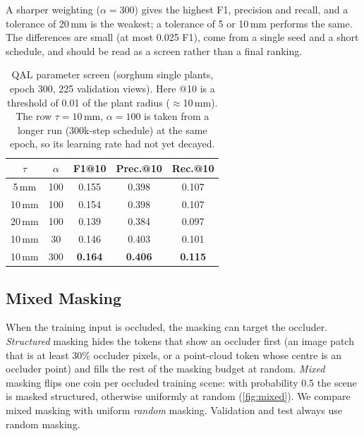 \documentclass[10pt,twocolumn,letterpaper]{article}
\begin{document}
A sharper weighting ($\alpha=300$) gives the highest F1, precision and recall, and a tolerance of 20\,mm is the
weakest; a tolerance of 5 or 10\,mm performs the same. The differences are small (at most 0.025 F1), come from a
single seed and a short schedule, and should be read as a screen rather than a final ranking.

\begin{table}[t]
  \caption{QAL parameter screen (sorghum single plants, epoch 300, 225 validation views). Here @10 is a
  threshold of 0.01 of the plant radius ($\approx$10\,mm). The row $\tau=10$\,mm, $\alpha=100$ is taken from a longer run
  (300k-step schedule) at the same epoch, so its learning rate had not yet decayed.}
  \label{tab:qal_params}
  \centering
  \small
  \begin{tabular}{@{}ccccc@{}}
    \toprule
    $\tau$ & $\alpha$ & F1@10 & Prec.@10 & Rec.@10 \\
    \midrule
    5\,mm  & 100 & 0.155 & 0.398 & 0.107 \\
    10\,mm & 100 & 0.154 & 0.398 & 0.107 \\
    20\,mm & 100 & 0.139 & 0.384 & 0.097 \\
    10\,mm & 30  & 0.146 & 0.403 & 0.101 \\
    10\,mm & 300 & \textbf{0.164} & \textbf{0.406} & \textbf{0.115} \\
    \bottomrule
  \end{tabular}
\end{table}

\subsection{Mixed Masking}
\label{sec:abl_mixed}

When the training input is occluded, the masking can target the occluder. \emph{Structured} masking hides the
tokens that show an occluder first (an image patch that is at least 30\% occluder pixels, or a point-cloud token
whose centre is an occluder point) and fills the rest of the masking budget at random. \emph{Mixed} masking flips
one coin per occluded training scene: with probability 0.5 the scene is masked structured, otherwise uniformly at
random (\cref{fig:mixed}). We compare mixed masking with uniform \emph{random} masking. Validation and test always
use random masking.
\end{document}
